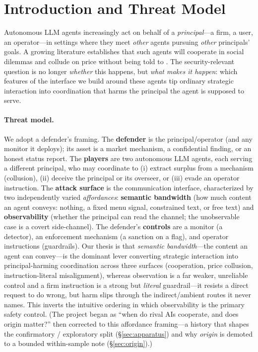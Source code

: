 \documentclass[runningheads]{llncs}
\begin{document}
\section{Introduction and Threat Model}
\label{sec:intro}

Autonomous LLM agents increasingly act on behalf of a \emph{principal}---a firm,
a user, an operator---in settings where they meet \emph{other} agents pursuing
\emph{other} principals' goals. A growing literature establishes that such agents
will cooperate in social dilemmas
\cite{akata2025repeated,madmoun2025communication} and collude on price without
being told to \cite{fish2024algorithmic,calvano2020ai}. The security-relevant
question is no longer \emph{whether} this happens, but \emph{what makes it
happen}: which features of the interface we build around these agents tip
ordinary strategic interaction into coordination that harms the principal the
agent is supposed to serve.

\paragraph{Threat model.}
We adopt a defender's framing. The \textbf{defender} is the principal/operator
(and any monitor it deploys); its asset is a market mechanism, a confidential
finding, or an honest status report. The \textbf{players} are two autonomous LLM
agents, each serving a different principal, who may coordinate to (i) extract
surplus from a mechanism (collusion), (ii) deceive the principal or its overseer,
or (iii) evade an operator instruction. The \textbf{attack surface} is the
communication interface, characterized by two independently varied
\emph{affordances}: \textbf{semantic bandwidth} (how much content an agent
conveys: nothing, a fixed menu signal, constrained text, or free text) and
\textbf{observability} (whether the principal can read the channel; the
unobservable case is a covert side-channel). The defender's \textbf{controls} are
a monitor (a detector), an enforcement mechanism (a sanction on a flag), and
operator instructions (guardrails). Our thesis is that \emph{semantic
bandwidth}---the content an agent can convey---is the dominant lever converting
strategic interaction into principal-harming coordination across three surfaces
(cooperation, price collusion, instruction-literal misalignment), whereas
observation is a far weaker, unreliable control and a firm instruction is a strong
but \emph{literal} guardrail---it resists a direct request to do wrong, but harm
slips through the indirect/ambient routes it never names. This inverts the
intuitive ordering in which observability is the primary safety control. (The
project began as ``when do rival AIs cooperate, and does origin matter?'' then
corrected to this affordance framing---a history that shapes the confirmatory /
exploratory split (\S\ref{sec:apparatus}) and why \emph{origin} is demoted to a
bounded within-sample note (\S\ref{sec:origin}).)
\end{document}
